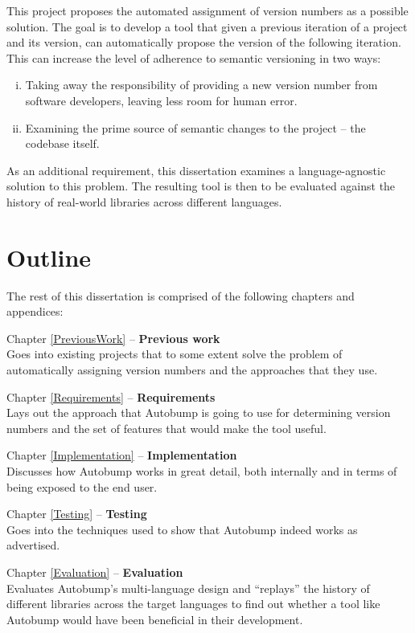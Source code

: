 \documentclass{l4proj}
\begin{document}
This project proposes the automated assignment of version numbers
as a possible solution. The goal is to develop a tool that given a
previous iteration of a project and its version, can automatically
propose the version of the following iteration. This can increase the
level of adherence to semantic versioning in two ways:

\begin{enumerate}[(i)]
\item Taking away the responsibility of providing a new version number
from software developers, leaving less room for human error.
\item Examining the prime source of semantic changes to the project --
the codebase itself.
\end{enumerate}

As an additional requirement, this dissertation examines a
language-agnostic solution to this problem. The resulting tool is then
to be evaluated against the history of real-world libraries across
different languages.

\section{Outline}

The rest of this dissertation is comprised of the following chapters
and appendices:

\noindent Chapter \ref{PreviousWork} -- \textbf{Previous work} \\
Goes into existing projects that to some extent solve the problem
of automatically assigning version numbers and the approaches that
they use.

\noindent Chapter \ref{Requirements} -- \textbf{Requirements} \\
Lays out the approach that Autobump is going to use for
determining version numbers and the set of features that would make
the tool useful.

\noindent Chapter \ref{Implementation} -- \textbf{Implementation} \\
Discusses how Autobump works in great detail, both internally and
in terms of being exposed to the end user.

\noindent Chapter \ref{Testing} -- \textbf{Testing} \\
Goes into the techniques used to show that Autobump indeed works
as advertised.

\noindent Chapter \ref{Evaluation} -- \textbf{Evaluation} \\
Evaluates Autobump's multi-language design and ``replays'' the history
of different libraries across the target languages to find out whether
a tool like Autobump would have been beneficial in their development.
\end{document}
